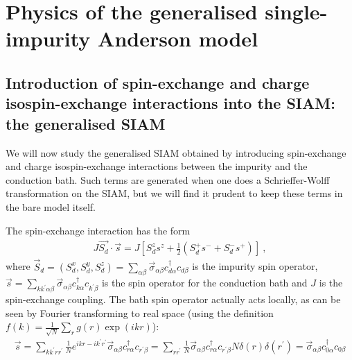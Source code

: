 \documentclass{report}
\numberwithin{equation}{section}
\begin{document}
\chapter{Physics of the generalised single-impurity Anderson model}
\section{Introduction of spin-exchange and charge isospin-exchange interactions into the SIAM: the generalised SIAM}
We will now study the generalised SIAM obtained by introducing spin-exchange and charge isospin-exchange interactions between the impurity and the conduction bath. Such terms are generated when one does a Schrieffer-Wolff transformation on the SIAM, but we will find it prudent to keep these terms in the bare model itself.

The spin-exchange interaction has the form
\begin{equation}\begin{aligned}
	J \vec{S_d}\cdot\vec{s} = J \left[S_d^z s^z + \frac{1}{2}\left( S_d^+ s^- + S_d^- s^+ \right) \right] ~,
\end{aligned}\end{equation}
where \(\vec S_d = \left(S_d^x, S_d^y, S_d^z\right) = \sum_{\alpha\beta}\vec \sigma_{\alpha\beta}c^\dagger_{d\alpha}c_{d\beta}\) is the impurity spin operator, \(\vec s = \sum_{kk^\prime\alpha\beta}\vec \sigma_{\alpha\beta}c^\dagger_{k\alpha}c_{k^\prime\beta}\) is the spin operator for the conduction bath and \(J\) is the spin-exchange coupling. The bath spin operator actually acts locally, as can be seen by Fourier transforming to real space (using the definition \(f(k) = \frac{1}{\sqrt N}\sum_r g(r)\exp(ikr)\)):
\begin{equation}\begin{aligned}
	\vec s = \sum_{k k^\prime r r^\prime} \frac{1}{N} e^{ikr - ik^\prime r^\prime} \vec \sigma_{\alpha\beta} c^\dagger_{r\alpha} c_{r^\prime\beta} = \sum_{rr^\prime}\frac{1}{N}\vec \sigma_{\alpha\beta} c^\dagger_{r\alpha} c_{r^\prime\beta} N \delta(r)\delta(r^\prime) = \vec \sigma_{\alpha\beta} c^\dagger_{0\alpha} c_{0\beta}
\end{aligned}\end{equation}
\end{document}
